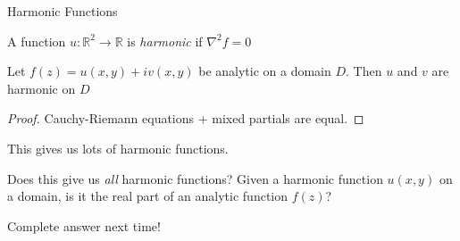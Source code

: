 \documentclass{beamer}
\newcommand{\R}{\mathbb{R}}
\begin{document}
\begin{frame}{Harmonic Functions}
\begin{definition}
A function $u:\R^2\to\R$ is \emph{harmonic} if $\nabla^2f=0$
\end{definition}

\begin{lemma}Let $f(z)=u(x,y)+iv(x,y)$ be analytic on a domain $D$.  Then $u$ and $v$ are harmonic on $D$
\end{lemma}
\begin{proof} Cauchy-Riemann equations + mixed partials are equal.
\end{proof}
This gives us lots of harmonic functions.  
\begin{block}{Does this give us \emph{all} harmonic functions?}
Given a harmonic function $u(x,y)$ on a domain, is it the real part of an analytic function $f(z)$?
\end{block}
\begin{block}{Complete answer next time!}
\end{block}

\end{frame}
\end{document}
